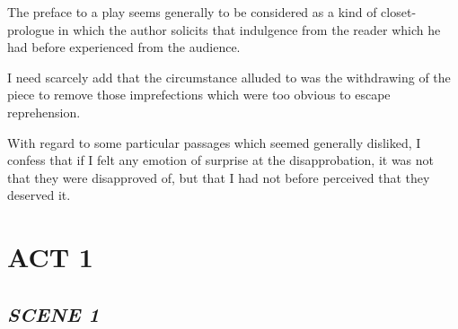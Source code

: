 \documentclass[11pt,a4paper,oneside]{memoir}  %
\begin{document}
  \begin{description}[itemsep=1ex,leftmargin=0.20cm]
    
    \item[] The preface to a play seems generally to be considered as a kind of closet-prologue in which the author solicits that indulgence from the reader which he had before experienced from the audience.
    
    \item[] I need scarcely add that the circumstance alluded to was the withdrawing of the piece to remove those imprefections which were too obvious to escape reprehension.
    
    \item[] With regard to some particular passages which seemed generally disliked, I confess that if I felt any emotion of surprise at the disapprobation, it was not that they were disapproved of, but that I had not before perceived that they deserved it.
    
  \end{description}
  
  \clearpage
  
  
  \chapter*{ACT 1}
  
  \section*{\textit{SCENE 1}}
  
\end{document}
